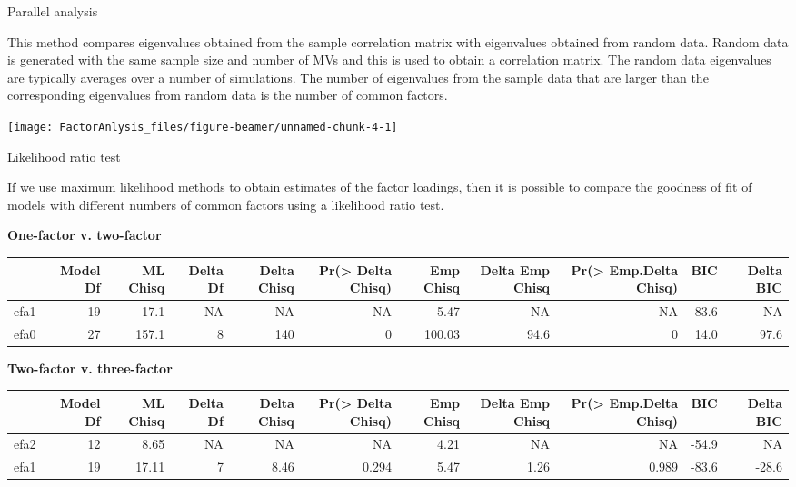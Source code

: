 \documentclass[10pt,ignorenonframetext,]{beamer}
\begin{document}
\begin{frame}{Parallel analysis}

This method compares eigenvalues obtained from the sample correlation
matrix with eigenvalues obtained from random data. Random data is
generated with the same sample size and number of MVs and this is used
to obtain a correlation matrix. The random data eigenvalues are
typically averages over a number of simulations. The number of
eigenvalues from the sample data that are larger than the corresponding
eigenvalues from random data is the number of common factors.

\texttt{[image: FactorAnlysis\_files/figure-beamer/unnamed-chunk-4-1]}

\end{frame}

\begin{frame}{Likelihood ratio test}

If we use maximum likelihood methods to obtain estimates of the factor
loadings, then it is possible to compare the goodness of fit of models
with different numbers of common factors using a likelihood ratio test.

\textbf{One-factor v. two-factor} \tiny

\begin{longtable}[]{@{}lrrrrrrrrrr@{}}
\toprule
& Model Df & ML Chisq & Delta Df & Delta Chisq & Pr(\textgreater{} Delta
Chisq) & Emp Chisq & Delta Emp Chisq & Pr(\textgreater{} Emp.Delta
Chisq) & BIC & Delta BIC\tabularnewline
\midrule
\endhead
efa1 & 19 & 17.1 & NA & NA & NA & 5.47 & NA & NA & -83.6 &
NA\tabularnewline
efa0 & 27 & 157.1 & 8 & 140 & 0 & 100.03 & 94.6 & 0 & 14.0 &
97.6\tabularnewline
\bottomrule
\end{longtable}

\normalsize

\textbf{Two-factor v. three-factor} \tiny

\begin{longtable}[]{@{}lrrrrrrrrrr@{}}
\toprule
& Model Df & ML Chisq & Delta Df & Delta Chisq & Pr(\textgreater{} Delta
Chisq) & Emp Chisq & Delta Emp Chisq & Pr(\textgreater{} Emp.Delta
Chisq) & BIC & Delta BIC\tabularnewline
\midrule
\endhead
efa2 & 12 & 8.65 & NA & NA & NA & 4.21 & NA & NA & -54.9 &
NA\tabularnewline
efa1 & 19 & 17.11 & 7 & 8.46 & 0.294 & 5.47 & 1.26 & 0.989 & -83.6 &
-28.6\tabularnewline
\bottomrule
\end{longtable}

\end{frame}
\end{document}
